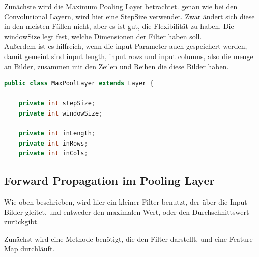 \documentclass[12pt]{article}
\begin{document}
Zunächste wird die Maximum Pooling Layer betrachtet.
genau wie bei den Convolutional Layern, wird hier eine StepSize verwendet. Zwar ändert sich diese in den meisten Fällen nicht, aber es ist gut, die Flexibilität zu haben.
Die windowSize legt fest, welche Dimensionen der Filter haben soll.
\\Außerdem ist es hilfreich, wenn die input Parameter auch gespeichert werden, damit gemeint sind input length, input rows und input columns, also die menge an Bilder, zusammen mit den Zeilen und Reihen die diese Bilder haben.

\begin{lstlisting}[language=Java]
public class MaxPoolLayer extends Layer {

    private int stepSize;
    private int windowSize;

    private int inLength;
    private int inRows;
    private int inCols;
\end{lstlisting} 

\subsection{Forward Propagation im Pooling Layer}
Wie oben beschrieben, wird hier ein kleiner Filter benutzt, der über die Input Bilder gleitet, und entweder den maximalen Wert, oder den Durchschnittswert zurückgibt. 


Zunächst wird eine Methode benötigt, die den Filter darstellt, und eine Feature Map durchläuft. 
\end{document}
